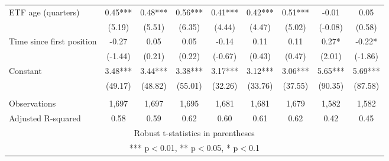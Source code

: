 \documentclass[]{article}
\begin{document}
\begin{tabular}{lcccccccc}
ETF age (quarters) & 0.45*** & 0.48*** & 0.56*** & 0.41*** & 0.42*** & 0.51*** & -0.01 & 0.05 \\
 & (5.19) & (5.51) & (6.35) & (4.44) & (4.47) & (5.02) & (-0.08) & (0.58) \\
Time since first position & -0.27 & 0.05 & 0.05 & -0.14 & 0.11 & 0.11 & 0.27* & -0.22* \\
 & (-1.44) & (0.21) & (0.22) & (-0.67) & (0.43) & (0.47) & (2.01) & (-1.86) \\
Constant & 3.48*** & 3.44*** & 3.38*** & 3.17*** & 3.12*** & 3.06*** & 5.65*** & 5.69*** \\
 & (49.17) & (48.82) & (55.01) & (32.26) & (33.76) & (37.55) & (90.35) & (87.58) \\
 &  &  &  &  &  &  &  &  \\
Observations & 1,697 & 1,697 & 1,695 & 1,681 & 1,681 & 1,679 & 1,582 & 1,582 \\
 Adjusted R-squared & 0.58 & 0.59 & 0.62 & 0.60 & 0.61 & 0.62 & 0.42 & 0.45 \\ \hline
\multicolumn{9}{c}{ Robust t-statistics in parentheses} \\
\multicolumn{9}{c}{ *** p$<$0.01, ** p$<$0.05, * p$<$0.1} \\
\end{tabular}
\end{document}
